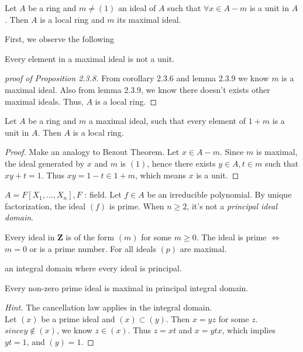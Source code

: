 \documentclass[11pt,fleqn]{book} %
\begin{document}
\begin{CJK}{UTF8}{gkai}
\begin{proposition}
	Let $A$ be a ring and $m \neq (1)$ an ideal of $A$ such that $\forall x \in A - m$ is a unit in $A$. Then $A$ is a local ring and $m$ its maximal ideal.
\end{proposition}

First, we observe the following
\begin{lemma}
	Every element in a maximal ideal is not a unit.
\end{lemma}

\begin{proof}[proof of Proposition 2.3.8]
	From corollary 2.3.6 and lemma 2.3.9 we know $m$ is a maximal ideal. Also from lemma 2.3.9, we know there doesn't exists other maximal ideals. Thus, $A$ is a local ring.
\end{proof}

\begin{proposition}
	Let $A$ be a ring and $m$ a maximal ideal, such that every element of $1 + m$ is a unit in $A$. Then $A$ is a local ring.
\end{proposition}
\begin{proof}
	Make an analogy to Bezout Theorem. Let $x \in A - m$. Since $m$ is maximal, the ideal generated by $x$ and $m$ is $(1)$, hence there exists $y \in A, t\in m$ such that $xy + t = 1$.
	Thus $xy = 1 - t \in 1 + m$, which means $x$ is a unit. 
\end{proof}

\begin{example}
	$A = F[X_1,...,X_n], F$ : field. Let $f \in A$ be an irreducible polynomial. By unique factorization, the ideal $(f)$ is prime. When $n \geq 2$, it's not a {\it principal ideal domain}.	
\end{example}

\begin{example}
	Every ideal in $\mathbf{Z}$ is of the form $(m)$ for some $m \geq 0$. The ideal is prime $\iff$ $m = 0$ or is a prime number. For all ideals $(p)$ are maximal.
\end{example}

\begin{definition}
	 an integral domain where every ideal is principal.
\end{definition}

\begin{proposition}
	Every non-zero prime ideal is maximal in principal integral domain.
\end{proposition}
\begin{proof}
	[Hint] The cancellation law applies in the integral domain. \\
	Let $(x)$ be a prime ideal and $(x) \subset (y)$. Then $x = yz$ for some $z$. $since y \notin (x)$, we know $z \in (x)$. Thus $z = xt$ and $x = ytx$, which implies $yt = 1$, and $(y) = 1$.
\end{proof}


\end{CJK}
\end{document}
